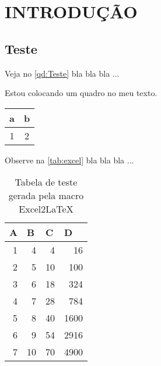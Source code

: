 
\chapter{INTRODUÇÃO}{}
\section{Teste}

Veja no \autoref{qd:Teste} bla bla bla ...

\begin{quadro}[h]
	\centering
	\caption{Estou colocando um quadro no meu texto.}
	\begin{tabular}{|c|c|}
		\hline
		a & b \\
		\hline
		1 & 2 \\
		\hline
	\end{tabular}
	\label{qd:Teste}
\end{quadro}

Observe na \autoref{tab:excel} bla bla bla ...
\begin{table}[htbp]
	\centering
	\caption{Tabela de teste gerada pela macro Excel2LaTeX}
	\begin{tabular}{rrrr}
		\toprule
		\multicolumn{1}{l}{\textbf{A}} & \multicolumn{1}{l}{\textbf{B}} & \multicolumn{1}{l}{\textbf{C}} & \multicolumn{1}{l}{\textbf{D}} \\
		\midrule
		\rowcolor[rgb]{ .851,  .851,  .851} 1     & 4     & 4     & 16 \\
		2     & 5     & 10    & 100 \\
		\rowcolor[rgb]{ .851,  .851,  .851} 3     & 6     & 18    & 324 \\
		4     & 7     & 28    & 784 \\
		\rowcolor[rgb]{ .851,  .851,  .851} 5     & 8     & 40    & 1600 \\
		6     & 9     & 54    & 2916 \\
		\rowcolor[rgb]{ .851,  .851,  .851} 7     & 10    & 70    & 4900 \\
		\bottomrule
	\end{tabular}%
	\label{tab:excel}%
\end{table}%

